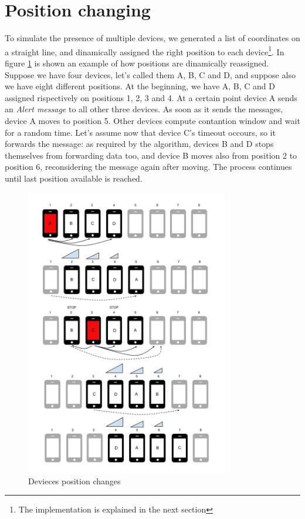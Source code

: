 \section{Position changing}
\label{sec:position_change}

To simulate the presence of multiple devices, we generated a list of coordinates on a straight line, and dinamically assigned the right position to each device\footnote{The implementation is explained in the next section}. In figure \ref{fig:positions} is shown an example of how positions are dinamically reassigned. Suppose we have four devices, let's called them A, B, C and D, and suppose also we have eight different positions. At the beginning, we have A, B, C and D assigned rispectively on positions 1, 2, 3 and 4. At a certain point device A sends an \emph{Alert message} to all other three devices. As soon as it sends the messages, device A moves to position 5. Other devices compute contantion window and wait for a random time. Let's assume now that device C's timeout occours, so it forwards the message: as required by the algorithm, devices B and D stops themselves from forwarding data too, and device B moves also from position 2 to position 6, reconsidering the message again after moving. The process continues until last position available is reached. 

\begin{figure}[htbp]
\centering
\includegraphics[width=3.5in]{imgs/Positions_1.png}
\caption{Devieces position changes}
\label{fig:positions}
\end{figure}
